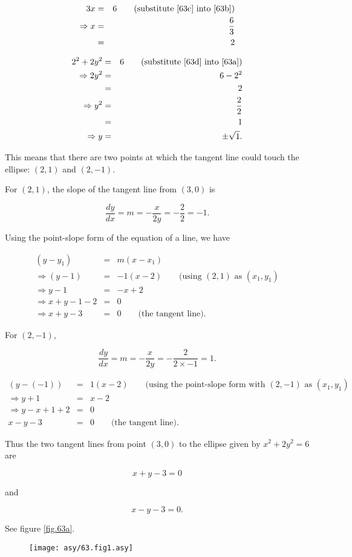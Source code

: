 \begin{eqnarray}
	3x&=&6\qquad\mbox{(substitute \ref{63c} into \ref{63b})}\nonumber\\
	\Rightarrow x&=&\frac{6}{3}\label{63d}\\
	&=&2\nonumber
\end{eqnarray}

\begin{eqnarray*}
	2^2+2y^2&=&6\qquad\mbox{(substitute \ref{63d} into \ref{63a})}\\
	\Rightarrow2y^2&=&6-2^2\\
	&=&2\\
	\Rightarrow y^2&=&\frac{2}{2}\\
	&=&1\\
	\Rightarrow y&=&\pm\sqrt{1}.
\end{eqnarray*}

This means that there are two points at which the tangent line could touch the ellipse: $\left(2,1\right)$ and $\left(2,-1\right)$.

For $\left(2,1\right)$, the slope of the tangent line from $\left(3,0\right)$ is

\[\frac{dy}{dx}=m=-\frac{x}{2y}=-\frac{2}{2}=-1.\]

Using the point-slope form of the equation of a line, we have

\begin{eqnarray*}
    \left(y-y_1\right)&=&m\left(x-x_1\right)\\
    \Rightarrow\left(y-1\right)&=&-1\left(x-2\right)\qquad\mbox{(using }\left(2,1\right)\mbox{ as }\left(x_1,y_1\right)\\
    \Rightarrow y-1&=&-x+2\\
    \Rightarrow x+y-1-2&=&0\\
    \Rightarrow x+y-3&=&0\qquad\mbox{(the tangent line).}
\end{eqnarray*}

For $\left(2,-1\right)$,

\[\frac{dy}{dx}=m=-\frac{x}{2y}=-\frac{2}{2\times-1}=1.\]

\begin{eqnarray*}
    \left(y-\left(-1\right)\right)&=&1\left(x-2\right)\qquad\mbox{(using the point-slope form with }\left(2,-1\right)\mbox{ as }\left(x_1,y_1\right)\\
    \Rightarrow y+1&=&x-2\\
    \Rightarrow y-x+1+2&=&0\\
    x-y-3&=&0\qquad\mbox{(the tangent line).}
\end{eqnarray*}

Thus the two tangent lines from point $\left(3,0\right)$ to the ellipse given by $x^2+2y^2=6$ are

\[x+y-3=0\]

and

\[x-y-3=0.\]

See figure \vref{fig.63a}.

\begin{figure}\caption{}\begin{center}\label{fig.63a}\texttt{[image: asy/63.fig1.asy]}\end{center}\end{figure}
